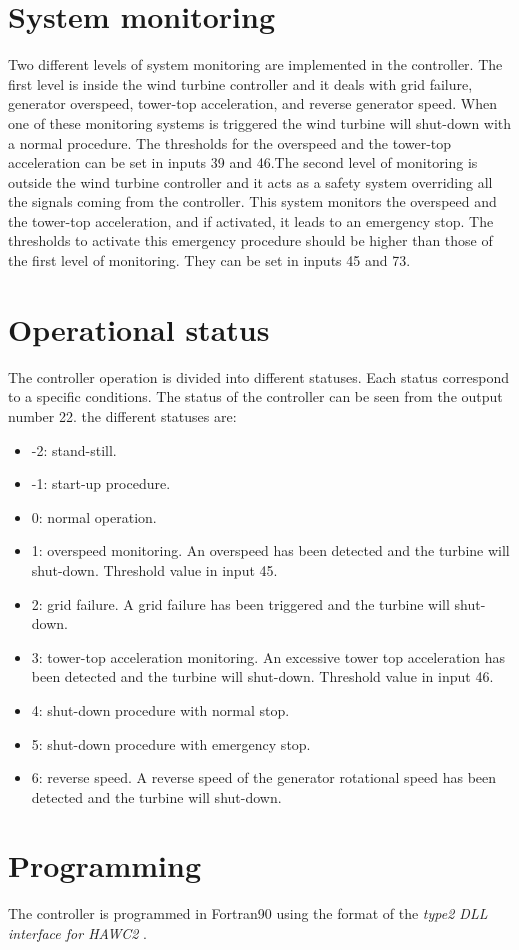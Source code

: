 \section{System monitoring}
Two different levels of system monitoring are implemented in the controller. The first level is inside the wind turbine controller and it deals with grid failure, generator overspeed, tower-top acceleration, and reverse generator speed. When one of these monitoring systems  is triggered the wind turbine will shut-down with a normal procedure. The thresholds for the overspeed and the tower-top acceleration can be set in inputs 39 and 46.The second level of monitoring is outside the wind turbine controller and it acts as a safety system overriding all the signals coming from the controller. This system monitors the overspeed and the tower-top acceleration, and if activated, it leads to an emergency stop. The thresholds to activate this emergency procedure should be higher than those of the first level of monitoring. They can be set in inputs 45 and 73.

\section{Operational status} \label{s:status}
The controller operation is divided into different statuses. Each status correspond to a specific conditions. The status of the controller can be seen from the output number 22.
the different statuses are:
\begin{itemize}
\item -2: stand-still.
\item -1: start-up procedure.
\item 0: normal operation.
\item 1: overspeed monitoring. An overspeed has been detected and the turbine will shut-down. Threshold value in input 45.
\item 2: grid failure. A grid failure has been triggered and the turbine will shut-down.
\item 3: tower-top acceleration monitoring. An excessive tower top acceleration has been detected and the turbine will shut-down. Threshold value in input 46.
\item 4: shut-down procedure with normal stop.
\item 5: shut-down procedure with emergency stop.
\item 6: reverse speed. A reverse speed of the generator rotational speed has been detected and the turbine will shut-down.
 \end{itemize} 


\section{Programming}

The controller is programmed in Fortran90 using the format of the \emph{type2 DLL interface for HAWC2} \cite{Larsen12}. 